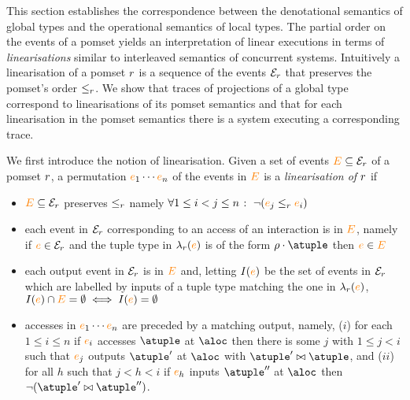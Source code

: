 
This section establishes the correspondence between the denotational
semantics of global types and the operational semantics of local
types.
%
The partial order on the events of a pomset yields an interpretation
of linear executions in terms of \emph{linearisations} similar to
interleaved semantics of concurrent systems.
%
Intuitively a linearisation of a pomset $r$ is a sequence of the
events $\mathcal{E}_{r}$ that preserves the pomset's order
$\leq_{r}$.
%
We show that traces of projections of a global type correspond to
linearisations of its pomset semantics and that for each linearisation
in the pomset semantics there is a system executing a corresponding
trace.
%

We first introduce the notion of linearisation.
%
Given a set of events ${\color{orange}{E}} \subseteq \mathcal{E}_{r}$ of a pomset $r$,
a permutation ${\color{orange}{e}}_1 \cdots {\color{orange}{e}}_n$ of the events in ${\color{orange}{E}}$ is a
\emph{linearisation of $r$} if
\begin{itemize}
\item ${\color{orange}{E}} \subseteq \mathcal{E}_{r}$ preserves $\leq_{r}$ namely
  $\forall 1 \leq i < j \leq n \;\colon\; \neg ({\color{orange}{e}}_j \leq_{r} {\color{orange}{e}}_i)$
\item each event in $\mathcal{E}_{r}$ corresponding to an access of an
  interaction is in ${\color{orange}{E}}$, namely
  if ${\color{orange}{e}} \in \mathcal{E}_{r}$ and the tuple type in $\lambda_{r}({\color{orange}{e}})$
  is of the form $\arole \cdot \atuple$ then ${\color{orange}{e}} \in {\color{orange}{E}}$
\item each output event in $\mathcal{E}_{r}$ is in ${\color{orange}{E}}$ and, letting
  $I({\color{orange}{e}})$ be the set of events in $\mathcal{E}_{r}$ which are labelled
  by inputs of a tuple type matching the one in $\lambda_{r}({\color{orange}{e}})$,
  $I({\color{orange}{e}}) \cap {\color{orange}{E}} = \emptyset \iff I({\color{orange}{e}}) = \emptyset$
\item accesses in ${\color{orange}{e}}_1 \cdots {\color{orange}{e}}_n$ are preceded by a matching
  output, namely, ($i$) for each $1 \leq i \leq n$ if ${\color{orange}{e}}_i$ accesses
  $\atuple$ at $\aloc$ then there is some $j$ with $1 \leq j < i$ such that ${\color{orange}{e}}_j$
  outputs $\atuple'$ at $\aloc$ with $\atuple' \matches \atuple$, and
  ($ii$) for all $h$ such that $j < h < i$ if ${\color{orange}{e}}_h$ inputs $\atuple''$ at $\aloc$
  then $\neg (\atuple' \matches \atuple'')$.
\end{itemize}

